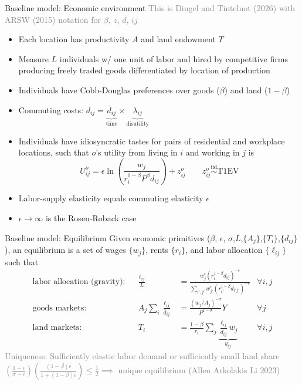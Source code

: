\documentclass[11pt,notes=hide,aspectratio=169]{beamer}
\begin{document}
\begin{frame}{Baseline model: Economic environment}
\textcolor{gray}{This is Dingel and Tintelnot (2026) with ARSW (2015) notation for $\beta$, $z$, $d$, $ij$}
\begin{itemize}
\item
Each location has productivity $A$ and land endowment $T$
\item 
Measure $L$ individuals w/ one unit of labor
and hired by 
competitive firms producing freely traded goods differentiated by location of production
\item
Individuals have Cobb-Douglas preferences over goods ($\beta$) and land ($1-\beta$) 
\item
Commuting costs: $d_{ij} = \underbrace{\bar{d}_{ij}}_{\text{time}} \times \underbrace{\lambda_{ij}}_{\text{disutility}}$
\item
Individuals have idiosyncratic tastes for pairs of residential and workplace locations,
such that
$o$'s utility from living in $i$ and working in $j$ is
\begin{equation*}
U_{ij}^{o} = \epsilon \ln\left(\frac{w_j}{r_i^{1-\beta} P^\beta d_{ij}}\right) + z_{ij}^{o}
\qquad
z_{ij}^{o} \stackrel{\text{iid}}{\sim} \text{T1EV}
\end{equation*}
\item Labor-supply elasticity equals commuting elasticity $\epsilon$
\item $\epsilon \to \infty$ is the Rosen-Roback case
\end{itemize}
\end{frame}
\begin{frame}{Baseline model: Equilibrium}
Given economic primitives ($\beta$, $\epsilon$, $\sigma$,$L$,$\{A_j\}$,$\{T_i\}$,$\{d_{ij}\}$),
an equilibrium is a set of wages $\{w_j\}$, rents $\{r_i\}$, and labor allocation $\{\ell_{ij}\}$
such that
\begin{align}
\text{labor allocation (gravity):}&&
\frac{\ell_{ij}}{L}
&=
\frac
{w_{j}^\epsilon \left(r_{i}^{1-\beta} d_{ij}\right)^{-\epsilon}}
{\sum_{i',j'}w_{j'}^\epsilon \left(r_{i'}^{1-\beta}  d_{i'j'}\right)^{-\epsilon}}
\label{eqn:cont_laborallocation}
&\forall i,j
\\
\text{goods markets:}&&
A_j \sum_i \frac{\ell_{ij}}{\bar{d}_{ij}} 
&=
\frac{\left({w_j}/{A_j}\right)^{-\sigma}}{P^{1-\sigma}} Y %
&\forall j
\label{eqn:tradeeqlbm:goodsmarketclearing}
\\
\text{land markets:}&&
T_i
&=
\frac{1-\beta}{r_i} \sum_j \underbrace{\frac{\ell_{ij}}{\bar{d}_{ij}} w_j}_{y_{ij}}
&\forall i,j
\label{eqn:tradeeqlbm:landsmarketclearing} 
\end{align}
\textcolor{gray}{Uniqueness: Sufficiently elastic labor demand or sufficiently small land share
$\left(\frac{1+\epsilon}{\sigma + \epsilon}\right) \left(\frac{(1-\beta) \epsilon}{1+(1-\beta) \epsilon}\right) \leq \frac{1}{2} \implies$ unique equilibrium (Allen Arkolakis Li 2023)}
\end{frame}
\end{document}
